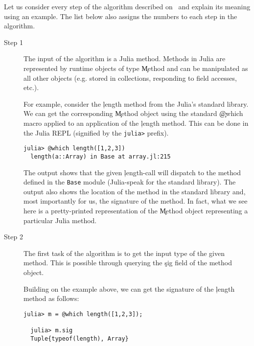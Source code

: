 Let us consider every step of the algorithm described
on~ and explain its meaning using an example.
The list below also assigns the numbers to each step in the algorithm.
\begin{description}

  \item[Step 1] The input of the algorithm is a Julia method. Methods in Julia are
  represented by runtime objects of type \c{Method} and can be manipulated as
  all other objects (e.g. stored in collections, responding to field accesses, etc.).

  For example, consider the \c{length} method from the Julia's standard library. We can
  get the corresponding \c{Method} object using the standard \c{@which} macro
  applied to an application of the \c{length} method. This can be done in the
  Julia REPL (signified by the \texttt{julia>} prefix).

\begin{minipage}{.92\textwidth}
\begin{lstlisting}[style=jterm]
  julia> @which length([1,2,3])
  length(a::Array) in Base at array.jl:215
\end{lstlisting}
\end{minipage}

  The output shows that the given \c{length}-call will dispatch to the
  method defined in the \texttt{Base} module (Julia-speak for the standard
  library). The output also shows the location of the method in the
  standard library and, most importantly for us, the signature of the
  method. In fact, what we see here is a pretty-printed representation of
  the \c{Method} object representing a particular Julia method.

  \item[Step 2] The first task of the algorithm is to get the input type of the given
  method. This is possible through querying the \c{sig} field of the method object.

  Building on the example above, we can get the signature of the \c{length}
  method as follows:

\begin{minipage}{.92\textwidth}
\begin{lstlisting}[style=jterm]
  julia> m = @which length([1,2,3]);

  julia> m.sig
  Tuple{typeof(length), Array}
\end{lstlisting}
\end{minipage}


\end{description}
